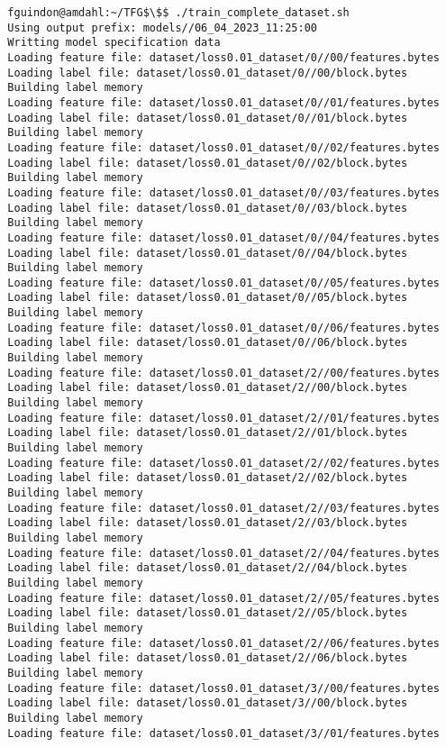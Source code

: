 \documentclass[12pt,oneside]{book}
\begin{document}
\begin{lstlisting}
  fguindon@amdahl:~/TFG$\$$ ./train_complete_dataset.sh
  Using output prefix: models//06_04_2023_11:25:00
  Writting model specification data
  Loading feature file: dataset/loss0.01_dataset/0//00/features.bytes
  Loading label file: dataset/loss0.01_dataset/0//00/block.bytes
  Building label memory
  Loading feature file: dataset/loss0.01_dataset/0//01/features.bytes
  Loading label file: dataset/loss0.01_dataset/0//01/block.bytes
  Building label memory
  Loading feature file: dataset/loss0.01_dataset/0//02/features.bytes
  Loading label file: dataset/loss0.01_dataset/0//02/block.bytes
  Building label memory
  Loading feature file: dataset/loss0.01_dataset/0//03/features.bytes
  Loading label file: dataset/loss0.01_dataset/0//03/block.bytes
  Building label memory
  Loading feature file: dataset/loss0.01_dataset/0//04/features.bytes
  Loading label file: dataset/loss0.01_dataset/0//04/block.bytes
  Building label memory
  Loading feature file: dataset/loss0.01_dataset/0//05/features.bytes
  Loading label file: dataset/loss0.01_dataset/0//05/block.bytes
  Building label memory
  Loading feature file: dataset/loss0.01_dataset/0//06/features.bytes
  Loading label file: dataset/loss0.01_dataset/0//06/block.bytes
  Building label memory
  Loading feature file: dataset/loss0.01_dataset/2//00/features.bytes
  Loading label file: dataset/loss0.01_dataset/2//00/block.bytes
  Building label memory
  Loading feature file: dataset/loss0.01_dataset/2//01/features.bytes
  Loading label file: dataset/loss0.01_dataset/2//01/block.bytes
  Building label memory
  Loading feature file: dataset/loss0.01_dataset/2//02/features.bytes
  Loading label file: dataset/loss0.01_dataset/2//02/block.bytes
  Building label memory
  Loading feature file: dataset/loss0.01_dataset/2//03/features.bytes
  Loading label file: dataset/loss0.01_dataset/2//03/block.bytes
  Building label memory
  Loading feature file: dataset/loss0.01_dataset/2//04/features.bytes
  Loading label file: dataset/loss0.01_dataset/2//04/block.bytes
  Building label memory
  Loading feature file: dataset/loss0.01_dataset/2//05/features.bytes
  Loading label file: dataset/loss0.01_dataset/2//05/block.bytes
  Building label memory
  Loading feature file: dataset/loss0.01_dataset/2//06/features.bytes
  Loading label file: dataset/loss0.01_dataset/2//06/block.bytes
  Building label memory
  Loading feature file: dataset/loss0.01_dataset/3//00/features.bytes
  Loading label file: dataset/loss0.01_dataset/3//00/block.bytes
  Building label memory
  Loading feature file: dataset/loss0.01_dataset/3//01/features.bytes

\end{lstlisting}
\end{document}

